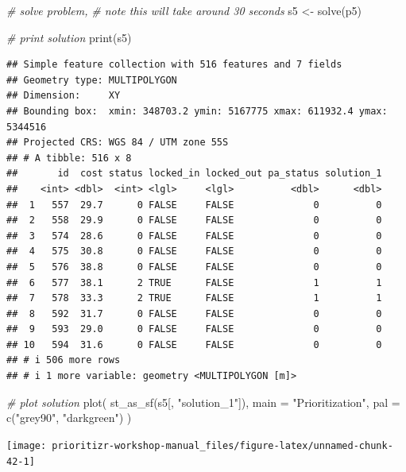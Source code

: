 \documentclass[
  12pt,
]{book}
\newenvironment{Shaded}{\begin{snugshade}}{\end{snugshade}}
\newcommand{\AttributeTok}[1]{\textcolor[rgb]{0.77,0.63,0.00}{#1}}
\newcommand{\CommentTok}[1]{\textcolor[rgb]{0.56,0.35,0.01}{\textit{#1}}}
\newcommand{\FunctionTok}[1]{\textcolor[rgb]{0.00,0.00,0.00}{#1}}
\newcommand{\NormalTok}[1]{#1}
\newcommand{\OtherTok}[1]{\textcolor[rgb]{0.56,0.35,0.01}{#1}}
\newcommand{\StringTok}[1]{\textcolor[rgb]{0.31,0.60,0.02}{#1}}
\begin{document}
\begin{Shaded}
\begin{Highlighting}[]
\CommentTok{\# solve problem,}
\CommentTok{\# note this will take around 30 seconds}
\NormalTok{s5 }\OtherTok{\textless{}{-}} \FunctionTok{solve}\NormalTok{(p5)}

\CommentTok{\# print solution}
\FunctionTok{print}\NormalTok{(s5)}
\end{Highlighting}
\end{Shaded}

\begin{verbatim}
## Simple feature collection with 516 features and 7 fields
## Geometry type: MULTIPOLYGON
## Dimension:     XY
## Bounding box:  xmin: 348703.2 ymin: 5167775 xmax: 611932.4 ymax: 5344516
## Projected CRS: WGS 84 / UTM zone 55S
## # A tibble: 516 x 8
##       id  cost status locked_in locked_out pa_status solution_1
##    <int> <dbl>  <int> <lgl>     <lgl>          <dbl>      <dbl>
##  1   557  29.7      0 FALSE     FALSE              0          0
##  2   558  29.9      0 FALSE     FALSE              0          0
##  3   574  28.6      0 FALSE     FALSE              0          0
##  4   575  30.8      0 FALSE     FALSE              0          0
##  5   576  38.8      0 FALSE     FALSE              0          0
##  6   577  38.1      2 TRUE      FALSE              1          1
##  7   578  33.3      2 TRUE      FALSE              1          1
##  8   592  31.7      0 FALSE     FALSE              0          0
##  9   593  29.0      0 FALSE     FALSE              0          0
## 10   594  31.6      0 FALSE     FALSE              0          0
## # i 506 more rows
## # i 1 more variable: geometry <MULTIPOLYGON [m]>
\end{verbatim}

\begin{Shaded}
\begin{Highlighting}[]
\CommentTok{\# plot solution}
\FunctionTok{plot}\NormalTok{(}
  \FunctionTok{st\_as\_sf}\NormalTok{(s5[, }\StringTok{"solution\_1"}\NormalTok{]), }\AttributeTok{main =} \StringTok{"Prioritization"}\NormalTok{,}
  \AttributeTok{pal =} \FunctionTok{c}\NormalTok{(}\StringTok{"grey90"}\NormalTok{, }\StringTok{"darkgreen"}\NormalTok{)}
\NormalTok{)}
\end{Highlighting}
\end{Shaded}

\begin{center}\texttt{[image: prioritizr-workshop-manual\_files/figure-latex/unnamed-chunk-42-1]} \end{center}
\end{document}
